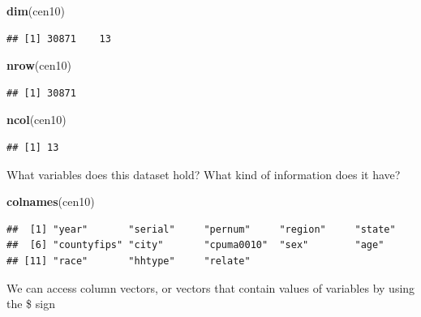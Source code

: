 \documentclass[]{book}
\newenvironment{Shaded}{\begin{snugshade}}{\end{snugshade}}
\newcommand{\KeywordTok}[1]{\textcolor[rgb]{0.13,0.29,0.53}{\textbf{#1}}}
\newcommand{\NormalTok}[1]{#1}
\newcommand{\OperatorTok}[1]{\textcolor[rgb]{0.81,0.36,0.00}{\textbf{#1}}}
\theoremstyle{definition}
\theoremstyle{definition}
\theoremstyle{definition}
\theoremstyle{remark}
\begin{document}
\begin{Shaded}
\begin{Highlighting}[]
\KeywordTok{dim}\NormalTok{(cen10)}
\end{Highlighting}
\end{Shaded}

\begin{verbatim}
## [1] 30871    13
\end{verbatim}

\begin{Shaded}
\begin{Highlighting}[]
\KeywordTok{nrow}\NormalTok{(cen10)}
\end{Highlighting}
\end{Shaded}

\begin{verbatim}
## [1] 30871
\end{verbatim}

\begin{Shaded}
\begin{Highlighting}[]
\KeywordTok{ncol}\NormalTok{(cen10)}
\end{Highlighting}
\end{Shaded}

\begin{verbatim}
## [1] 13
\end{verbatim}

What variables does this dataset hold? What kind of information does it have?

\begin{Shaded}
\begin{Highlighting}[]
\KeywordTok{colnames}\NormalTok{(cen10)}
\end{Highlighting}
\end{Shaded}

\begin{verbatim}
##  [1] "year"       "serial"     "pernum"     "region"     "state"     
##  [6] "countyfips" "city"       "cpuma0010"  "sex"        "age"       
## [11] "race"       "hhtype"     "relate"
\end{verbatim}

We can access column vectors, or vectors that contain values of variables by using the \$ sign

\begin{Shaded}
\end{Shaded}
\end{document}

